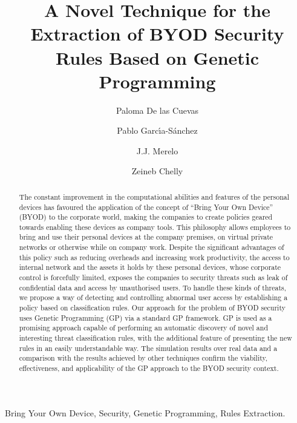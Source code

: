 \documentclass[a4paper,10pt,twocolumn,preprint,3p]{elsarticle}
\begin{document}
\begin{frontmatter}

\title{A Novel Technique for the Extraction of BYOD Security Rules Based on Genetic Programming}

\author[ugr]{Paloma De las Cuevas}
\author[uca]{Pablo Garc\'{\i}a-S\'anchez}
\author[ugr]{J.J. Merelo}
\author[isgt]{Zeineb Chelly}

\address[ugr]{Department of Computer Architecture and Computer Technology, ETSIIT and CITIC \\
University of Granada, Granada, Spain. Tel: +34958241778. Fax: +34958248993}
\address[uca]{Department of Computer Engineering, School of Engineering \\
University of C\'adiz, Spain.}
\address[isgt]{LARODEC, Institut Sup\'erieur de Gestion de Tunis, Tunisia.}


\begin{abstract}
The constant improvement in the computational abilities and features of the personal devices has favoured the application of the concept of ``Bring Your Own Device'' (BYOD) to the corporate world, making the companies to
create policies geared towards enabling these devices as company tools. 
This philosophy allows
employees to bring and use their personal devices at
the company premises, on virtual private networks or otherwise while
on company work. Despite the significant advantages of this policy
such as reducing overheads and increasing work productivity, 
the
access to internal network and the assets it holds by these personal
devices, whose corporate control is forcefully limited, exposes the companies to
security threats such as leak of confidential data and access by
unauthorised users. 
To handle these kinds of threats, we propose a way of detecting and controlling abnormal user
access by establishing a policy based on classification rules. Our
approach for the problem of BYOD security uses Genetic Programming
(GP) via a standard GP framework. GP is used as a promising approach %
capable of performing an automatic discovery of novel and interesting
threat classification rules, with the additional feature of presenting
the new rules in an easily understandable way. %
The simulation results over real data and a
comparison with the results achieved by other techniques confirm the
viability, effectiveness, and applicability of the GP approach to the
BYOD security context.
\end{abstract}


\begin{keyword}
Bring Your Own Device, Security, Genetic Programming, Rules Extraction. 
\end{keyword}

\end{frontmatter}
\end{document}

